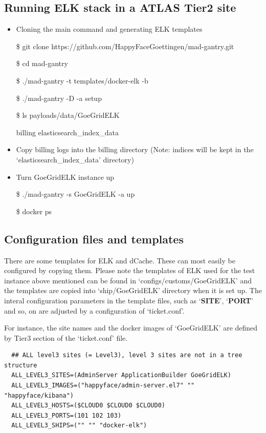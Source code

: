 \documentclass[]{article}
\begin{document}
\subsection{Running ELK stack in a ATLAS Tier2
site}\label{running-elk-stack-in-a-atlas-tier2-site}

\begin{itemize}
\item
  Cloning the main command and generating ELK templates

  \$ git clone https://github.com/HappyFaceGoettingen/mad-gantry.git

  \$ cd mad-gantry

  \$ ./mad-gantry -t templates/docker-elk -b

  \$ ./mad-gantry -D -a setup

  \$ ls payloads/data/GoeGridELK

  billing elasticsearch\_index\_data
\item
  Copy billing logs into the billing directory (Note: indices will be
  kept in the `elasticsearch\_index\_data' directory)
\item
  Turn GoeGridELK instance up

  \$ ./mad-gantry -s GoeGridELK -a up

  \$ docker ps
\end{itemize}

\subsection{Configuration files and
templates}\label{configuration-files-and-templates}

There are some templates for ELK and dCache. These can most easily be
configured by copying them. Please note the templates of ELK used for
the test instance above mentioned can be found in
`configs/customs/GoeGridELK' and the templates are copied into
`ship/GoeGridELK' directory when it is set up. The interal configuration
parameters in the template files, such as `\textbf{SITE}',
`\textbf{PORT}' and so, on are adjusted by a configuration of
`ticket.conf'.

For instance, the site names and the docker images of `GoeGridELK' are
defined by Tier3 section of the `ticket.conf' file.

\begin{verbatim}
  ## ALL level3 sites (= Level3), level 3 sites are not in a tree structure
  ALL_LEVEL3_SITES=(AdminServer ApplicationBuilder GoeGridELK)
  ALL_LEVEL3_IMAGES=("happyface/admin-server.el7" "" "happyface/kibana")
  ALL_LEVEL3_HOSTS=($CLOUD0 $CLOUD0 $CLOUD0)
  ALL_LEVEL3_PORTS=(101 102 103)
  ALL_LEVEL3_SHIPS=("" "" "docker-elk")
\end{verbatim}
\end{document}
